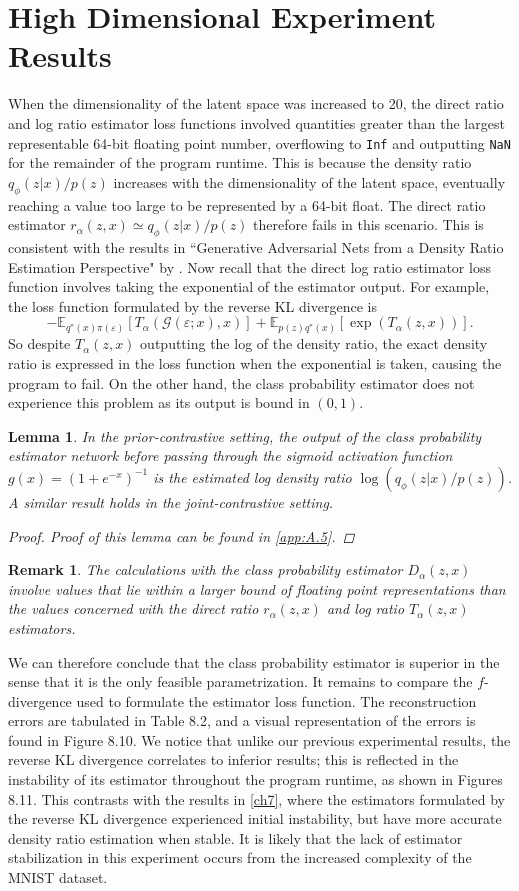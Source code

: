 \documentclass[honours,12pt, twoside]{unswthesis}
\newcommand{\E}{\mathbb{E}}
\newtheorem{lemma}[theorem]{Lemma}
\newtheorem{remark}[theorem]{Remark}
\numberwithin{equation}{section}
\theoremstyle{definition}
\begin{document}
\section{High Dimensional Experiment Results}
When the dimensionality of the latent space was increased to 20, the direct ratio and log ratio estimator loss functions involved quantities greater than the largest representable 64-bit floating point number, overflowing to \verb+Inf+ and outputting \verb+NaN+ for the remainder of the program runtime. This is because the density ratio $q_\phi(z|x)/p(z)$ increases with the dimensionality of the latent space, eventually reaching a value too large to be represented by a 64-bit float. The direct ratio estimator $r_\alpha(z,x)\simeq q_\phi(z|x)/p(z)$ therefore fails in this scenario. This is consistent with the results in ``Generative Adversarial Nets from a Density Ratio Estimation Perspective" by \citet{bgan}. Now recall that the direct log ratio estimator loss function involves taking the exponential of the estimator output. For example, the loss function formulated by the reverse KL divergence is
\[-\E_{q^*(x)\pi(\varepsilon)}[T_\alpha(\mathcal{G}(\varepsilon;x),x)]+\E_{p(z)q^*(x)}[\exp(T_\alpha(z,x))].\]
So despite $T_\alpha(z,x)$ outputting the log of the density ratio, the exact density ratio is expressed in the loss function when the exponential is taken, causing the program to fail. On the other hand, the class probability estimator does not experience this problem as its output is bound in $(0,1)$.
\begin{lemma}
In the prior-contrastive setting, the output of the class probability estimator network before passing through the sigmoid activation function $g(x)=(1+e^{-x})^{-1}$ is the estimated log density ratio $\log \left(q_\phi(z|x)/p(z)\right)$. A similar result holds in the joint-contrastive setting.
\begin{proof}
Proof of this lemma can be found in \autoref{app:A.5}.
\end{proof}
\end{lemma}
\begin{remark}
The calculations with the class probability estimator $D_\alpha(z,x)$ involve values that lie within a larger bound of floating point representations than the values concerned with the direct ratio $r_\alpha(z,x)$ and log ratio $T_\alpha(z,x)$ estimators.
\end{remark}
We can therefore conclude that the class probability estimator is superior in the sense that it is the only feasible parametrization. It remains to compare the $f$-divergence used to formulate the estimator loss function. The reconstruction errors are tabulated in Table 8.2, and a visual representation of the errors is found in Figure 8.10. We notice that unlike our previous experimental results, the reverse KL divergence correlates to inferior results; this is reflected in the instability of its estimator throughout the program runtime, as shown in Figures 8.11. This contrasts with the results in \autoref{ch7}, where the estimators formulated by the reverse KL divergence experienced initial instability, but have more accurate density ratio estimation when stable. It is likely that the lack of estimator stabilization in this experiment occurs from the increased complexity of the MNIST dataset.  
\end{document}
